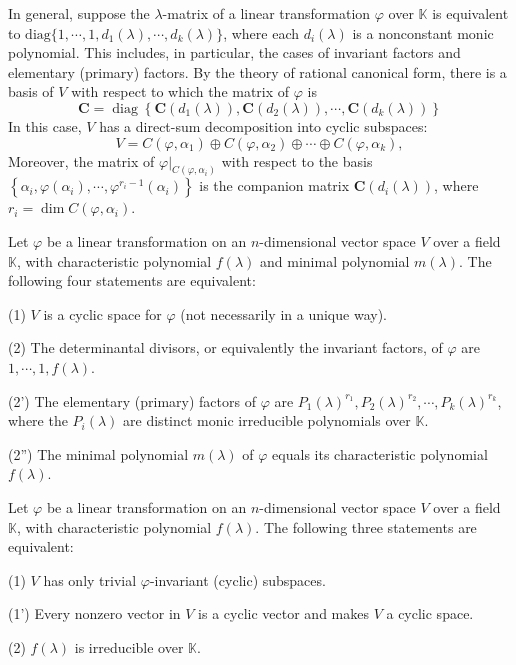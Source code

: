 \documentclass[12pt, a4paper, oneside]{book}
\begin{document}
\begin{theorem}
    In general, suppose the $\lambda$-matrix of a linear transformation $\varphi$ over $\mathbb{K}$ is equivalent to $\mathrm{diag}\{1, \cdots, 1, d_1(\lambda), \cdots, d_k(\lambda)\}$, where each $d_i(\lambda)$ is a nonconstant monic polynomial. This includes, in particular, the cases of invariant factors and elementary (primary) factors.
    By the theory of rational canonical form, there is a basis of $V$ with respect to which the matrix of $\varphi$ is
    \[
        \mathbf{C}=\operatorname{diag}\left\{\mathbf{C}\left(d_1(\lambda)\right), \mathbf{C}\left(d_2(\lambda)\right), \cdots, \mathbf{C}\left(d_k(\lambda)\right)\right\}
    \]
    In this case, $V$ has a direct-sum decomposition into cyclic subspaces:
    \[
        V=C\left({\varphi}, {\alpha}_1\right) \oplus C\left({\varphi}, {\alpha}_2\right) \oplus \cdots \oplus C\left({\varphi}, {\alpha}_k\right),
    \]
    Moreover, the matrix of $\left.{\varphi}\right|_{C\left({\varphi}, {\alpha}_i\right)}$ with respect to the basis $\left\{{\alpha}_i, {\varphi}\left({\alpha}_i\right), \cdots, {\varphi}^{r_i-1}\left({\alpha}_i\right)\right\}$ is the companion matrix $\mathbf{C}\left(d_i(\lambda)\right)$, where $r_i=\operatorname{dim} C\left({\varphi}, {\alpha}_i\right)$.
\end{theorem}

\begin{corollary}
    Let $\varphi$ be a linear transformation on an $n$-dimensional vector space $V$ over a field $\mathbb{K}$, with characteristic polynomial $f(\lambda)$ and minimal polynomial $m(\lambda)$. The following four statements are equivalent:

    (1) $V$ is a cyclic space for $\varphi$ (not necessarily in a unique way).

    (2) The determinantal divisors, or equivalently the invariant factors, of $\varphi$ are $1, \cdots, 1, f(\lambda)$.

    (2') The elementary (primary) factors of ${\varphi}$ are $P_1(\lambda)^{r_1}, P_2(\lambda)^{r_2}, \cdots, P_k(\lambda)^{r_k}$, where the $P_i(\lambda)$ are distinct monic irreducible polynomials over $\mathbb{K}$.

    (2'') The minimal polynomial $m(\lambda)$ of ${\varphi}$ equals its characteristic polynomial $f(\lambda)$.


\end{corollary}

\begin{corollary}
    Let $\varphi$ be a linear transformation on an $n$-dimensional vector space $V$ over a field $\mathbb{K}$, with characteristic polynomial $f(\lambda)$. The following three statements are equivalent:

    (1) $V$ has only trivial $\varphi$-invariant (cyclic) subspaces.

    (1') Every nonzero vector in $V$ is a cyclic vector and makes $V$ a cyclic space.

    (2) $f(\lambda)$ is irreducible over $\mathbb{K}$.
\end{corollary}
\end{document}
